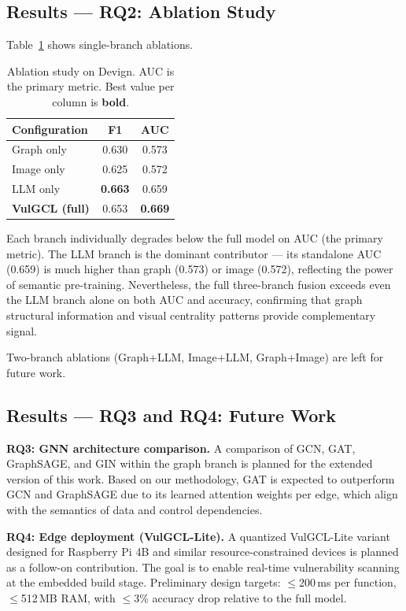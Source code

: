 \subsection{Results — RQ2: Ablation Study}

Table~\ref{tab:ablation} shows single-branch ablations.

\begin{table}[t]
\centering
\small
\caption{Ablation study on Devign. AUC is the primary metric.
Best value per column is \textbf{bold}.}
\label{tab:ablation}
\begin{tabular}{lcc}
\toprule
Configuration & F1 & AUC \\
\midrule
Graph only              & 0.630 & 0.573 \\
Image only              & 0.625 & 0.572 \\
LLM only                & \textbf{0.663} & 0.659 \\
\textbf{VulGCL (full)}  & 0.653 & \textbf{0.669} \\
\bottomrule
\end{tabular}
\end{table}

Each branch individually degrades below the full model on AUC (the primary metric).
The LLM branch is the dominant contributor — its standalone AUC (0.659) is much
higher than graph (0.573) or image (0.572), reflecting the power of semantic
pre-training. Nevertheless, the full three-branch fusion exceeds even the LLM branch
alone on both AUC and accuracy, confirming that graph structural information and
visual centrality patterns provide complementary signal.

Two-branch ablations (Graph+LLM, Image+LLM, Graph+Image) are left for future work.

\subsection{Results — RQ3 and RQ4: Future Work}

\textbf{RQ3: GNN architecture comparison.}
A comparison of GCN, GAT, GraphSAGE, and GIN within the graph branch is planned for
the extended version of this work. Based on our methodology, GAT is expected to
outperform GCN and GraphSAGE due to its learned attention weights per edge, which
align with the semantics of data and control dependencies.

\textbf{RQ4: Edge deployment (VulGCL-Lite).}
A quantized VulGCL-Lite variant designed for Raspberry Pi 4B and similar
resource-constrained devices is planned as a follow-on contribution. The goal is to
enable real-time vulnerability scanning at the embedded build stage. Preliminary
design targets: $\leq$200\,ms per function, $\leq$512\,MB RAM, with $\leq$3\%
accuracy drop relative to the full model.
